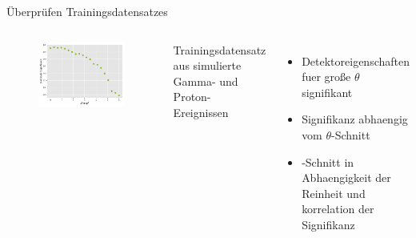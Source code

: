 \documentclass[aspectratio=1610, professionalfonts, 9pt]{beamer}
\begin{document}
\begin{frame}{Überprüfen Trainingsdatensatzes}
  \begin{columns}[onlytextwidth]
	\begin{figure}
	  \centering
	  \includegraphics[width=\textwidth]{./Plots/corr_sig_theta2.pdf}
	\end{figure}
	Trainingsdatensatz aus simulierte Gamma- und Proton-Ereignissen
	\begin{itemize}
	  \item Detektoreigenschaften fuer große $\theta$ signifikant
	  \item Signifikanz abhaengig vom $\theta$-Schnitt
	  \item \theta-Schnitt in Abhaengigkeit der Reinheit und korrelation der Signifikanz
	\end{itemize}
  \end{columns}
\end{frame}
\end{document}
